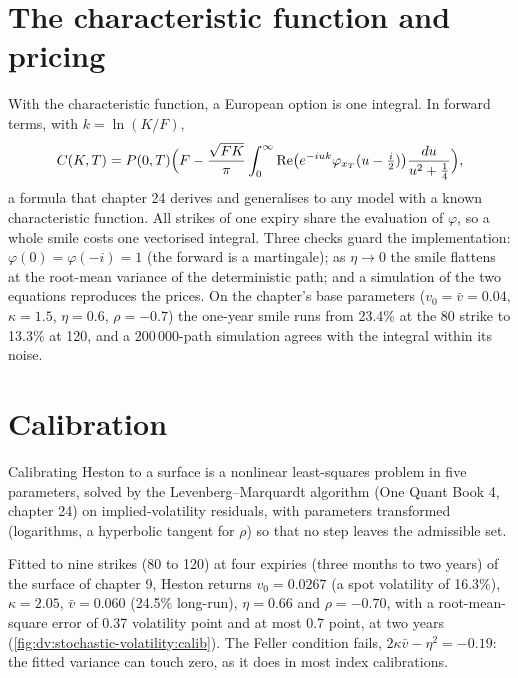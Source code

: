 \section{The characteristic function and pricing}

With the characteristic function, a European option is one integral. In forward terms, with
$k=\ln(K/F)$,
\begin{equation}\label{eq:dv:stochastic-volatility:lewis}
C(K,T)=P(0,T)\Bigl(F-\frac{\sqrt{FK}}{\pi}\int_0^\infty\operatorname{Re}\bigl(e^{-iuk}
\varphi_{x_T}(u-\tfrac i2)\bigr)\frac{du}{u^2+\frac14}\Bigr),
\end{equation}
a formula that chapter 24 derives and generalises to any model with a known characteristic
function. All strikes of one expiry share the evaluation of $\varphi$, so a whole smile costs one
vectorised integral. Three checks guard the implementation: $\varphi(0)=\varphi(-i)=1$ (the
forward is a martingale); as $\eta\to0$ the smile flattens at the root-mean variance of the
deterministic path; and a simulation of the two equations reproduces the prices. On the chapter's
base parameters ($v_0=\bar v=0.04$, $\kappa=1.5$, $\eta=0.6$, $\rho=-0.7$) the one-year smile runs from
23.4\% at the 80 strike to 13.3\% at 120, and a 200\,000-path simulation agrees with the integral within
its noise.

\section{Calibration}

Calibrating Heston to a surface is a nonlinear least-squares problem in five parameters, solved by the
Levenberg--Marquardt algorithm (One Quant Book 4, chapter 24) on implied-volatility residuals, with
parameters transformed (logarithms, a hyperbolic tangent for $\rho$) so that no step leaves the
admissible set.

\begin{example}\label{ex:dv:stochastic-volatility:calib}
Fitted to nine strikes (80 to 120) at four expiries (three months to two years) of the surface of
chapter 9, Heston returns $v_0=0.0267$ (a spot volatility of 16.3\%), $\kappa=2.05$, $\bar v=0.060$
(24.5\% long-run), $\eta=0.66$ and $\rho=-0.70$, with a root-mean-square error of 0.37 volatility point
and at most 0.7 point, at two years (\cref{fig:dv:stochastic-volatility:calib}). The Feller condition
fails, $2\kappa\bar v-\eta^2=-0.19$: the fitted variance can touch zero, as it does in most index
calibrations.
\end{example}

